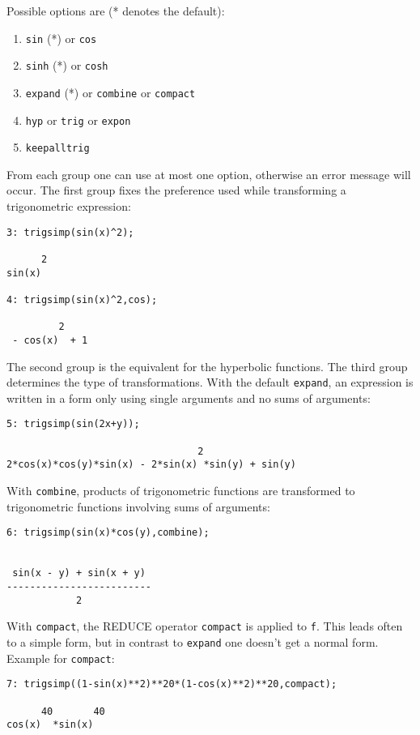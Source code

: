 Possible options are (* denotes the default):
\begin{enumerate}
\item {\tt sin} (*) or {\tt cos}
\item {\tt sinh} (*) or {\tt cosh}
\item {\tt expand} (*) or {\tt combine} or {\tt compact}
\item {\tt hyp} or {\tt trig} or {\tt expon}
\item {\tt keepalltrig}
\end{enumerate}

From each group one can use at most one option, otherwise an error 
message will occur. The first group fixes the preference used while 
transforming a trigonometric expression:
{\small
\begin{verbatim}
3: trigsimp(sin(x)^2);

      2
sin(x)

4: trigsimp(sin(x)^2,cos);

         2
 - cos(x)  + 1
\end{verbatim}
}\noindent

The second group is the equivalent for the hyperbolic functions. 
The third group determines the type of transformations. With 
the default {\tt expand}, an expression is written in a form only using 
single arguments and no sums of arguments:
{\small
\begin{verbatim}
5: trigsimp(sin(2x+y));

                                 2
2*cos(x)*cos(y)*sin(x) - 2*sin(x) *sin(y) + sin(y)
\end{verbatim}
}\noindent

With {\tt combine}, products of trigonometric functions are transformed to 
trigonometric functions involving sums of arguments:
{\small
\begin{verbatim}
6: trigsimp(sin(x)*cos(y),combine);

        
 sin(x - y) + sin(x + y)
-------------------------
            2
\end{verbatim}
}\noindent

With {\tt compact}, the REDUCE operator {\tt compact} \cite{hearns}
is applied to {\tt f}. 
This leads often to a simple form, but in contrast to {\tt expand} one 
doesn't get a normal form. Example for {\tt compact}:
{\small
\begin{verbatim}
7: trigsimp((1-sin(x)**2)**20*(1-cos(x)**2)**20,compact);

      40       40
cos(x)  *sin(x)
\end{verbatim}
}\noindent


